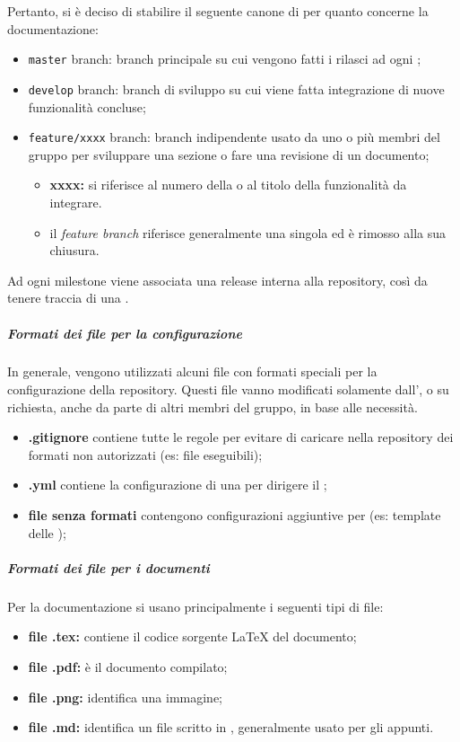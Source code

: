 		Pertanto, si è deciso di stabilire il seguente canone di  per quanto concerne la documentazione:
		\begin{itemize}
			\item \verb!master! branch: branch principale su cui vengono fatti i rilasci ad ogni ;
			\item \verb!develop! branch: branch di sviluppo su cui viene fatta integrazione di nuove funzionalità concluse;
			\item \verb!feature/xxxx! branch: branch indipendente usato da uno o più membri del gruppo per sviluppare una sezione o fare una revisione di un documento;
			\begin{itemize}
				\item \textbf{xxxx:} si riferisce al numero della  o al titolo della funzionalità da integrare.
				\item il \textit{feature branch} riferisce generalmente una singola  ed è rimosso alla sua chiusura.
			\end{itemize}
		\end{itemize}

		Ad ogni milestone viene associata una release interna alla repository, così da tenere traccia di una .

		\subparagraph{Formati dei file per la configurazione}

		In generale, vengono utilizzati alcuni file con formati speciali per la configurazione della repository. Questi file vanno modificati solamente dall', o su richiesta, anche da parte di altri membri del gruppo, in base alle necessità.
		\begin{itemize}
			\item \textbf{.gitignore} contiene tutte le regole per evitare di caricare nella repository dei formati non autorizzati (es: file eseguibili);
			\item \textbf{.yml} contiene la configurazione di una  per dirigere il ;
			\item \textbf{file senza formati} contengono configurazioni aggiuntive per  (es: template delle );
		\end{itemize}

		\subparagraph{Formati dei file per i documenti}

		Per la documentazione si usano principalmente i seguenti tipi di file:
		\begin{itemize}
			\item \textbf{file .tex:} contiene il codice sorgente \LaTeX{} del documento;
			\item \textbf{file .pdf:} è il documento compilato;
			\item \textbf{file .png:} identifica una immagine;
			\item \textbf{file .md:} identifica un file scritto in , generalmente usato per gli appunti.
		\end{itemize}

